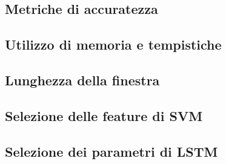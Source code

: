 \subsection{Metriche di accuratezza}
\label{ssec:metriche-di-accuratezza-hexi}

\subsection{Utilizzo di memoria e tempistiche}
\label{ssec:utilizzo-di-memoria-e-tempistiche-hexi}

\subsection{Lunghezza della finestra}
\label{ssec:lunghezza-della-finestra-hexi}

\subsection{Selezione delle feature di SVM}
\label{ssec:selezione-delle-feature-di-svm-hexi}

\subsection{Selezione dei parametri di LSTM}
\label{ssec:selezione-dei-parametri-di-lstm-hexi}
